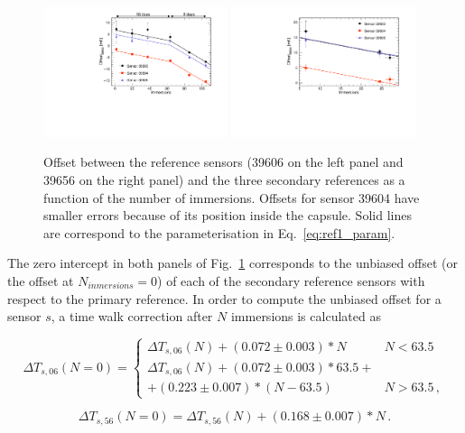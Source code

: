 \begin{figure}[htbp]
\centering
{\includegraphics[width=0.48\textwidth]{images/figure_11_a.pdf}}
{\includegraphics[width=0.48\textwidth]{images/figure_11_b.pdf}}
\caption{Offset between the reference sensors (39606 on the left panel and 39656 on the right panel) and the three secondary references as a function of the number of immersions. Offsets for sensor 39604 have smaller errors because of its position inside the capsule. Solid lines are correspond to the parameterisation in Eq.~\ref{eq:ref1_param}.}
\label{fig:offset_ref}
\end{figure}

The zero intercept in both panels of Fig.~\ref{fig:offset_ref} corresponds to the unbiased offset (or the offset at $N_{inmersions}=0$) of each of the secondary reference sensors with respect to the primary reference. In order to compute the unbiased offset for a sensor $s$, a time walk correction after $N$ immersions is calculated as 

\begin{equation}
\Delta T_{s,06}(N=0)=
    \begin{cases}
        \Delta T_{s,06}(N)+(0.072\pm0.003)*N                             & N<63.5\\
        \Delta T_{s,06}(N)+(0.072\pm0.003)*63.5+\\+(0.223\pm0.007)*(N-63.5) & N>63.5 \,,
    \end{cases}
    \label{eq:ref1_param}
\end{equation}

\begin{equation}
\Delta T_{s,56}(N=0)=\Delta T_{s,56}(N)+(0.168\pm0.007)*N  \, .
\label{eq:ref2_param}
\end{equation}

